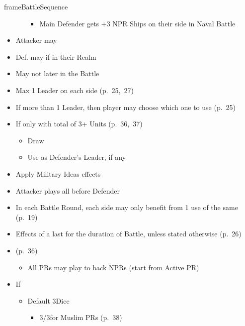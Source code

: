 \documentclass[10pt]{article}
\newlength{\fhBattleSequence} \setlength\fhBattleSequence{31\baselineskip}
\begin{document}
\begin{dynamiccontents*}{frameBattleSequence}
\begin{eubox}{\fhBattleSequence}
\begin{multicols}{3}
\begin{itemize}
\begin{itemize}
{				\begin{itemize}
					\item Main Defender gets +3 NPR Ships on their side in Naval Battle
				\end{itemize}
				}
			\end{itemize}
			\item Attacker may 
			\item Def. may  if in their Realm
			\item May not  later in the Battle
			\item Max 1 Leader on each side (p.~25,~27)
			\item If more than 1 Leader, then player may choose which one to use (p.~25)
			\item If only  with total of 3+ Units (p.~36,~37)
			\begin{itemize}
				\item Draw \milcard
				\item Use as Defender's Leader, if any
			\end{itemize}
			\item Apply Military Ideas effects
		\end{itemize}
		\begin{itemize}
			\item Attacker plays all \battleactions before Defender
			\item In each Battle Round, each side may only benefit from 1 use of the same \battleaction (p.~19)
			\item Effects of a \battleaction last for the duration of Battle, unless stated otherwise (p.~26)
			\item {} (p.~36)
			\begin{itemize}
				\item All PRs may play \battleactions to back NPRs (start from Active PR)
			\end{itemize}
		\end{itemize}
		\begin{itemize}
			\item If 
			\begin{itemize}
				\item Default 3\infantry Dice
				\begin{itemize}
					\item 3\infantry/3\cavalry for Muslim PRs (p.~38)

\end{itemize}
\end{itemize}
\end{itemize}
\end{multicols}
\end{eubox}
\end{dynamiccontents*}
\end{document}

